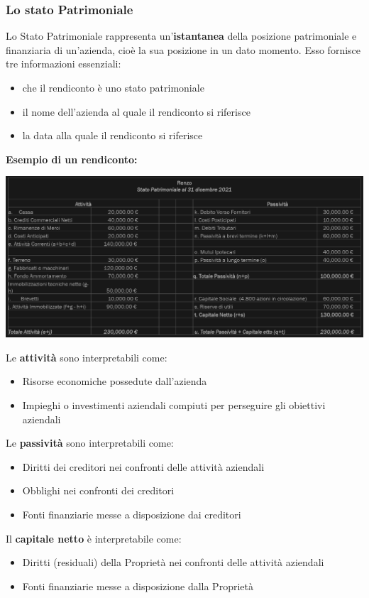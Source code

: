 \documentclass{article}
\begin{document}
\subsubsection{Lo stato Patrimoniale}
Lo Stato Patrimoniale rappresenta un'\textbf{istantanea}
della posizione patrimoniale e finanziaria di
un'azienda, cioè la sua posizione in un dato
momento. Esso fornisce tre informazioni essenziali:
\begin{itemize}
    \item che il rendiconto è uno stato patrimoniale\
    \item il nome dell'azienda al quale il rendiconto si riferisce
    \item la data alla quale il rendiconto si riferisce
\end{itemize}
\textbf{Esempio di un rendiconto:}
\begin{center}
    \includegraphics[scale=0.29]{Image/Rendiconto renzo.png
    }
\end{center}
Le \textbf{attività} sono interpretabili come:
\begin{itemize}
    \item Risorse economiche possedute dall'azienda
    \item Impieghi o investimenti aziendali compiuti per perseguire gli obiettivi
aziendali
\end{itemize}
Le \textbf{passività} sono interpretabili come:
\begin{itemize}
    \item Diritti dei creditori nei confronti delle attività aziendali
    \item Obblighi nei confronti dei creditori
    \item Fonti finanziarie messe a disposizione dai creditori
\end{itemize}
Il \textbf{capitale netto} è interpretabile come:
\begin{itemize}
    \item Diritti (residuali) della Proprietà nei confronti delle attività aziendali
    \item Fonti finanziarie messe a disposizione dalla Proprietà
\end{itemize}
\end{document}
